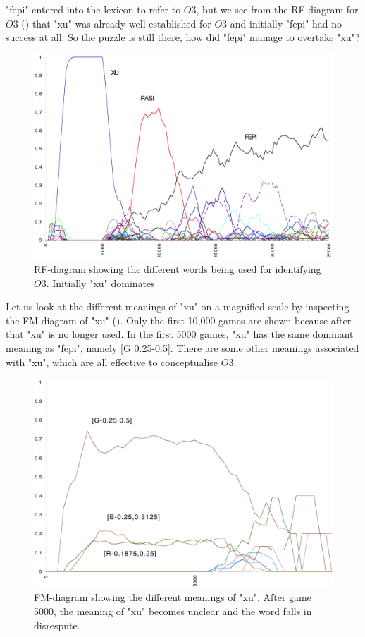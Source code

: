 "fepi" entered into the lexicon to refer to $O3$, but we see
from the RF diagram for $O3$ () that 
"xu" was already well established for $O3$ and initially 
"fepi" had no success at all. 
So the puzzle is still there, how did "fepi" manage to 
overtake "xu"? 
\begin{figure}[htbp]
  \centerline{\includegraphics[width=.80\textwidth]{chap7/figs/RF-O3}}
\caption{ \label{RF-O3a} RF-diagram showing the different
words being used for identifying $O3$. Initially "xu" 
dominates }
\end{figure}
Let us look at the different meanings of "xu" on 
a magnified scale by 
inspecting the FM-diagram of "xu" (). 
Only the first 10,000 games are shown because after
that "xu" is no longer used. In the first 5000 games,  
"xu" has the same dominant meaning as "fepi", namely
[G 0.25-0.5]. There are some other meanings 
associated with "xu", which are all effective 
to conceptualise $O3$.
\begin{figure}[htbp]
  \centerline{\includegraphics[width=.80\textwidth]{chap7/figs/FM-XU}}
\caption{ \label{FM-XU.f} FM-diagram showing the different
meanings of "xu". After game 5000, the meaning of "xu" becomes
unclear and the word falls in disrespute.}
\end{figure}


